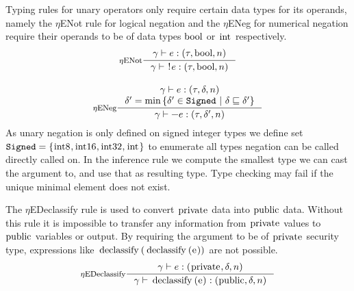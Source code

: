 \documentclass[a4paper, 10pt, draft]{report}
\newcommand{\mycode}[1]{\ensuremath{\mbox{\lstinline{#1}}}}
\begin{document}
Typing rules for unary operators only require certain data types for its
operands, namely the $\eta$ENot rule for logical negation and the $\eta$ENeg
for numerical negation require their operands to be of data types \mycode{bool}
or \mycode{int} respectively.
\[\begin{array}{c}
\inference[$\eta$ENot]{\gamma |- e : (\tau, \mycode{bool}, n)}{\gamma |- \mycode{!}e : (\tau, \mycode{bool}, n)} \\[2em]

\inference[$\eta$ENeg]{
  \gamma |- e : (\tau, \delta, n) \\
  \delta' = \min \left\{ \delta'\in\mathtt{Signed}\ |\ \delta \sqsubseteq \delta' \right\}
}{
  \gamma |- \mycode{-}e : (\tau, \delta', n)
}
\end{array} \]
As unary negation is only defined on signed integer types we define set
$\mathtt{Signed} = \left\{ \mycode{int8}, \mycode{int16}, \mycode{int32}, \mycode{int} \right\}$ to enumerate all
types negation can be called directly called on. In the inference rule we
compute the smallest type we can cast the argument to, and use that as
resulting type. Type checking may fail if the unique minimal element does not
exist.

The $\eta$EDeclassify rule is used to convert \mycode{private} data into
\mycode{public} data. Without this rule it is impossible to transfer any
information from \mycode{private} values to \mycode{public} variables or
output. By requiring the argument to be of \mycode{private} security type,
expressions like \mycode{declassify(declassify(e))} are not possible.
\[
\inference[$\eta$EDeclassify]{\gamma |- e : (\mycode{private}, \delta, n)}{\gamma |- \mycode{declassify(e)} : (\mycode{public}, \delta, n)}
\]
\end{document}

